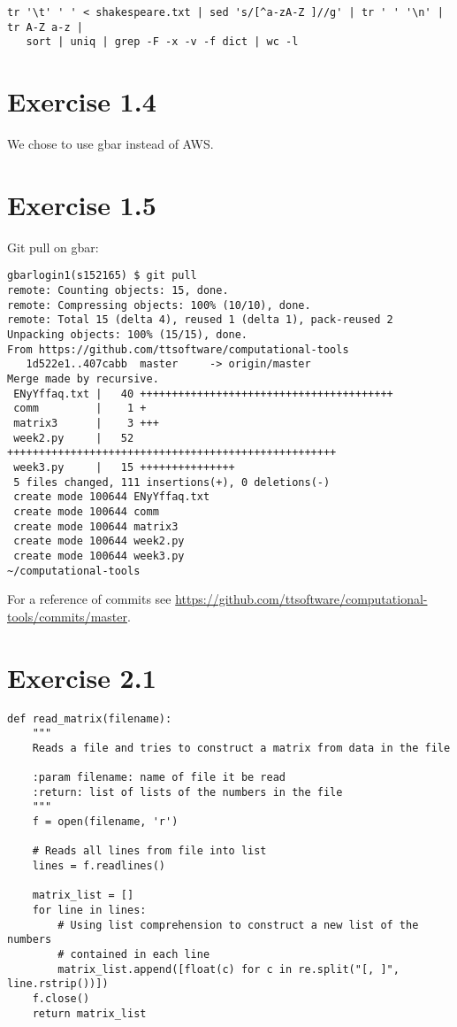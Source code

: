 \documentclass{article}
\begin{document}
\begin{verbatim}
tr '\t' ' ' < shakespeare.txt | sed 's/[^a-zA-Z ]//g' | tr ' ' '\n' | tr A-Z a-z | 
   sort | uniq | grep -F -x -v -f dict | wc -l
\end{verbatim}


\section{Exercise 1.4}

We chose to use gbar instead of AWS.

\section{Exercise 1.5}

Git pull on gbar: 

\begin{lstlisting}
gbarlogin1(s152165) $ git pull
remote: Counting objects: 15, done.
remote: Compressing objects: 100% (10/10), done.
remote: Total 15 (delta 4), reused 1 (delta 1), pack-reused 2
Unpacking objects: 100% (15/15), done.
From https://github.com/ttsoftware/computational-tools
   1d522e1..407cabb  master     -> origin/master
Merge made by recursive.
 ENyYffaq.txt |   40 ++++++++++++++++++++++++++++++++++++++++
 comm         |    1 +
 matrix3      |    3 +++
 week2.py     |   52 ++++++++++++++++++++++++++++++++++++++++++++++++++++
 week3.py     |   15 +++++++++++++++
 5 files changed, 111 insertions(+), 0 deletions(-)
 create mode 100644 ENyYffaq.txt
 create mode 100644 comm
 create mode 100644 matrix3
 create mode 100644 week2.py
 create mode 100644 week3.py
~/computational-tools
\end{lstlisting}

For a reference of commits see \href{https://github.com/ttsoftware/computational-tools/commits/master}{https://github.com/ttsoftware/computational-tools/commits/master}.

\section{Exercise 2.1}

\begin{lstlisting}
def read_matrix(filename):
    """
    Reads a file and tries to construct a matrix from data in the file

    :param filename: name of file it be read
    :return: list of lists of the numbers in the file
    """
    f = open(filename, 'r')

    # Reads all lines from file into list
    lines = f.readlines()

    matrix_list = []
    for line in lines:
        # Using list comprehension to construct a new list of the numbers
        # contained in each line
        matrix_list.append([float(c) for c in re.split("[, ]", line.rstrip())])
    f.close()
    return matrix_list
\end{lstlisting}
\end{document}

